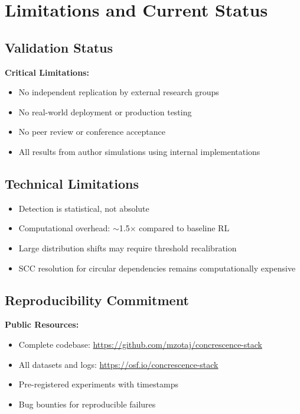 \documentclass[11pt]{article}
\begin{document}
\section{Limitations and Current Status}

\subsection{Validation Status}

\textbf{Critical Limitations:}
\begin{itemize}
    \item No independent replication by external research groups
    \item No real-world deployment or production testing
    \item No peer review or conference acceptance
    \item All results from author simulations using internal implementations
\end{itemize}

\subsection{Technical Limitations}

\begin{itemize}
    \item Detection is statistical, not absolute
    \item Computational overhead: $\sim$1.5$\times$ compared to baseline RL
    \item Large distribution shifts may require threshold recalibration
    \item SCC resolution for circular dependencies remains computationally expensive
\end{itemize}

\subsection{Reproducibility Commitment}

\textbf{Public Resources:}
\begin{itemize}
    \item Complete codebase: \url{https://github.com/mzotaj/concrescence-stack}
    \item All datasets and logs: \url{https://osf.io/concrescence-stack}
    \item Pre-registered experiments with timestamps
    \item Bug bounties for reproducible failures
\end{itemize}
\end{document}
